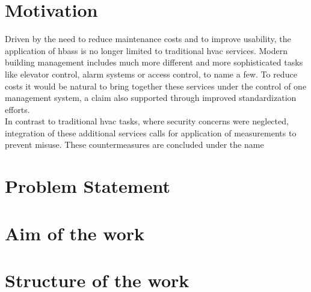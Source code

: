 \section{Motivation}

Driven by the need to reduce maintenance costs and to improve usability, the application of \glspl{hbas} is no longer limited to traditional \gls{hvac} services.
Modern building management includes much more different and more sophisticated tasks like elevator control, alarm systems or access control, to name a few.
To reduce costs it would be natural to bring together these services under the control of one management system, a claim also supported through improved 
standardization efforts.
\\
In contrast to traditional \gls{hvac} tasks, where security concerns were neglected, integration of these additional services calls for application of measurements
to prevent misuse. These countermeasures are concluded under the name 


\section{Problem Statement}

\section{Aim of the work}

\section{Structure of the work}




